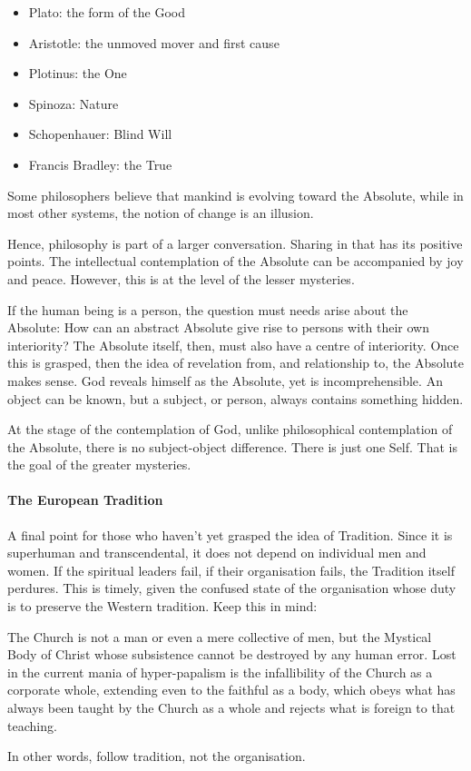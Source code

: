 \begin{itemize}
\item Plato: the form of the Good 
\item Aristotle: the unmoved mover and first cause 
\item Plotinus: the One 
\item Spinoza: Nature 
\item Schopenhauer: Blind Will 
\item Francis Bradley: the True 
\end{itemize}
Some philosophers believe that mankind is evolving toward the Absolute, while in most other systems, the notion of change is an illusion.

Hence, philosophy is part of a larger conversation. Sharing in that has its positive points. The intellectual contemplation of the Absolute can be accompanied by joy and peace. However, this is at the level of the lesser mysteries.

If the human being is a person, the question must needs arise about the Absolute: How can an abstract Absolute give rise to persons with their own interiority? The Absolute itself, then, must also have a centre of interiority. Once this is grasped, then the idea of revelation from, and relationship to, the Absolute makes sense. God reveals himself as the Absolute, yet is incomprehensible. An object can be known, but a subject, or person, always contains something hidden.

At the stage of the contemplation of God, unlike philosophical contemplation of the Absolute, there is no subject-object difference. There is just one Self. That is the goal of the greater mysteries.

\paragraph{The European Tradition}
A final point for those who haven't yet grasped the idea of Tradition. Since it is superhuman and transcendental, it does not depend on individual men and women. If the spiritual leaders fail, if their organisation fails, the Tradition itself perdures. This is timely, given the confused state of the organisation whose duty is to preserve the Western tradition. Keep this in mind:

\begin{quotex}
The Church is not a man or even a mere collective of men, but the Mystical Body of Christ whose subsistence cannot be destroyed by any human error. Lost in the current mania of hyper-papalism is the infallibility of the Church as a corporate whole, extending even to the faithful as a body, which obeys what has always been taught by the Church as a whole and rejects what is foreign to that teaching. 

\end{quotex}
In other words, follow tradition, not the organisation.



